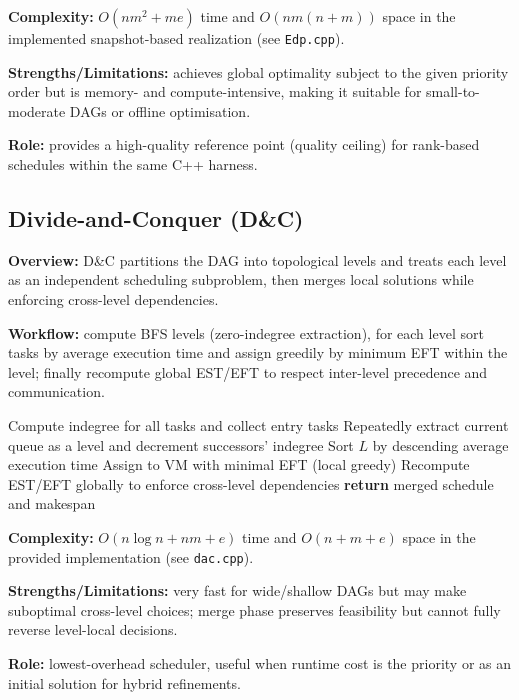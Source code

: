 \documentclass[conference]{IEEEtran}
\begin{document}
\textbf{Complexity:} $O(n m^2 + m e)$ time and $O(n m (n+m))$ space in
the implemented snapshot-based realization (see \texttt{Edp.cpp}).

\textbf{Strengths/Limitations:} achieves global optimality subject to
the given priority order but is memory- and compute-intensive, making
it suitable for small-to-moderate DAGs or offline optimisation.

\textbf{Role:} provides a high-quality reference point (quality
ceiling) for rank-based schedules within the same C++ harness.

\subsection{Divide-and-Conquer (D\&C)}

\textbf{Overview:} D\&C partitions the DAG into topological levels
and treats each level as an independent scheduling subproblem, then
merges local solutions while enforcing cross-level dependencies.

\textbf{Workflow:} compute BFS levels (zero-indegree extraction), for
each level sort tasks by average execution time and assign greedily by
minimum EFT within the level; finally recompute global EST/EFT to
respect inter-level precedence and communication.

\begin{algorithm}[!t]
\caption{D\&C Level Scheduling}
\begin{algorithmic}[1]
\STATE Compute indegree for all tasks and collect entry tasks
\STATE Repeatedly extract current queue as a level and decrement successors' indegree
      \STATE Sort $L$ by descending average execution time
            \STATE Assign to VM with minimal EFT (local greedy)
      \ENDFOR
\ENDFOR
\STATE Recompute EST/EFT globally to enforce cross-level dependencies
\STATE \textbf{return} merged schedule and makespan
\end{algorithmic}
\end{algorithm}

\textbf{Complexity:} $O(n\log n + n m + e)$ time and $O(n+m+e)$ space
in the provided implementation (see \texttt{dac.cpp}).

\textbf{Strengths/Limitations:} very fast for wide/shallow DAGs but may
make suboptimal cross-level choices; merge phase preserves feasibility but
cannot fully reverse level-local decisions.

\textbf{Role:} lowest-overhead scheduler, useful when runtime cost is
the priority or as an initial solution for hybrid refinements.
\end{document}
